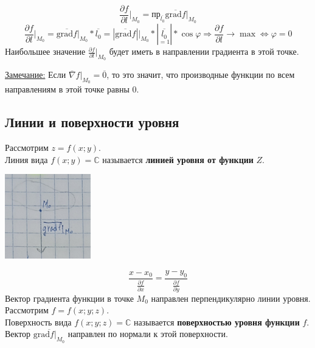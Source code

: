 \documentclass[12pt]{article}
\begin{document}
    \[ \boxed{ \frac{\partial f}{\partial l} \Big|_{M_0} = \text{пр}_{\overline{l_0}}\overline{\text{grad}f}\Big|_{M_0} } \]
    \[ \frac{\partial f}{\partial l}\Big|_{M_0} = \overline{\text{grad}f}\Big|_{M_0} * \overline{l_0} = |\overline{\text{grad}f}|\Big|_{M_0} * |\underset{=1}{\overline{l_0}}| * \cos \varphi \Rightarrow \frac{\partial f}{\partial l} \to \max \Leftrightarrow \varphi = 0 \]
    Наибольшее значение $\frac{\partial f}{\partial l}\Big|_{M_0}$ будет иметь в направлении градиента в этой точке.\par\noindent
    \underline{Замечание:} Если $\overline{\nabla} f\Big|_{M_0} = \overline{0}$, то это значит, что производные функции по всем направлениям в этой точке равны $0$.

    \subsection{Линии и поверхности уровня}\noindent
    Рассмотрим $z = f(x;y)$.\\
    Линия вида $f(x;y) = \mathbb{C}$ называется \textbf{линией уровня от функции} $Z$.
    \begin{center}
        \includegraphics{7.11.1.png}
    \end{center}
    \[ \frac{x-x_0}{\frac{\partial f}{\partial x}} = \frac{y-y_0}{\frac{\partial f}{\partial y}} \]
    Вектор градиента функции в точке $M_0$ направлен перпендикулярно линии уровня.\\
    Рассмотрим $f = f(x;y;z)$.\\
    Поверхность вида $f(x;y;z) = \mathbb{C}$ называется \textbf{поверхностью уровня функции} $f$.\\
    Вектор $\overline{\text{grad}f \Big|_{M_0}}$ направлен по нормали к этой поверхности.
\end{document}

